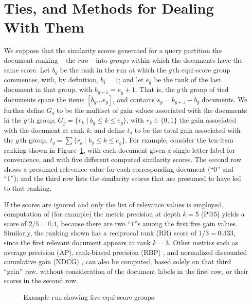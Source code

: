 \section{Ties, and Methods for Dealing With Them}
\label{sec-ties}


We suppose that the similarity scores generated for a query partition
the document ranking -- the {\emph{run}} -- into {\emph{groups}}
within which the documents have the same score.
Let $b_g$ be the rank in the run at which the $g$\,th equi-score
group commences, with, by definition, $b_1=1$; and let $e_g$ be the
rank of the last document in that group, with $b_{g+1}=e_g+1$.
That is, the $g$\,th group of tied documents spans the items
$[b_g\ldots e_g]$, and contains $s_g=b_{g+1}-b_g$ documents.
We further define $G_g$ to be the multiset of gain values associated
with the documents in the $g$\,th group,
	$G_g =\{r_k\mid b_g \le k \le e_g\}$, 
with $r_k\in\{0,1\}$ the gain associated with the document at rank $k$;
and define $t_g$
to be the total gain associated with the $g$\,th group,
	$t_g = \sum \{r_k\mid b_g \le k \le e_g\}$.
For example, consider the ten-item ranking shown in
Figure~\ref{fig-example}, with each document given a single letter
label for convenience, and with five different computed similarity
scores.
The second row shows a presumed relevance value for each
corresponding document (``$0$'' and ``1''); and the third row lists
the similarity scores that are presumed to have led to that ranking.

If the scores are ignored and only the list of relevance values is
employed, computation of (for example) the metric precision at depth
$k=5$ (P@$5$) yields a score of $2/5=0.4$, because there are two
``$1$''s among the first five gain values.
Similarly, the ranking shown has a reciprocal rank (RR) score of
$1/3=0.333$, since the first relevant document appears at rank $k=3$.
Other metrics such as average precision (AP), rank-biased precision
(RBP) {\citep{mz08acmtois}}, and normalized discounted cumulative
gain (NDCG) {\citep{jk02acmtois}}, can also be computed, based solely
on that third ``gain'' row, without consideration of the document
labels in the first row, or their scores in the second row.

\begin{figure}[t]
\centering

\caption{Example run showing five equi-score groups.
\label{fig-example}}
\end{figure}

